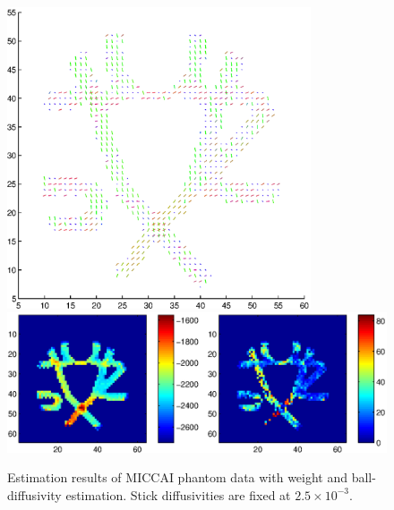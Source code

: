 \documentclass{article}
\begin{document}
\begin{figure}[H]
  \caption{Estimation results of MICCAI phantom data with weight and ball-diffusivity estimation. Stick diffusivities are fixed at $2.5\times 10^{-3}$.}
  \centering
  \includegraphics[width=0.8\textwidth]{figures/phantom_bas_weights_dir.eps}
  \includegraphics[width=\textwidth]{figures/phantom_bas_weights_like.eps}
\end{figure}
\end{document}
